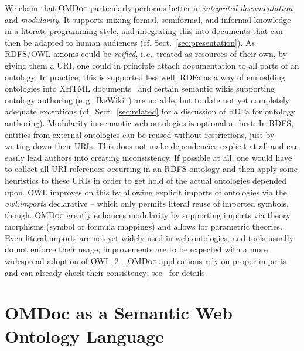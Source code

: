 \documentclass{llncs}
\renewcommand{\omdoc}{\textsc{OMDoc}\xspace}
\begin{document}
We claim that \omdoc particularly performs better in {\emph{integrated documentation}} and
{\emph{modularity}}.  It supports mixing formal, semiformal, and informal knowledge in a
literate-programming style, and integrating this into documents that can then be adapted
to human audiences (cf. Sect.~\ref{sec:presentation}).  As RDFS/OWL axioms could be
\emph{reified}, i.\,e.\ treated as resources of their own, by giving them a URI, one could
in principle attach documentation to all parts of an ontology.  In practice, this is
supported less well.  RDFa as a way of embedding ontologies into XHTML
documents~\cite{AdidaEtAl08:RDFa} and certain semantic wikis supporting ontology authoring
(e.\,g.\ IkeWiki~\cite{schaffert06:STICA-ikewiki}) are notable, but to date not yet
completely adequate exceptions (cf.\ Sect.~\ref{sec:related} for a discussion of RDFa for
ontology authoring).  Modularity in semantic web ontologies is optional at best: In RDFS,
entities from external ontologies can be reused without restrictions, just by writing down
their URIs.  This does not make dependencies explicit at all and can easily lead authors
into creating inconsistency.  If possible at all, one would have to collect all URI
references occurring in an RDFS ontology and then apply some heuristics to these URIs in
order to get hold of the actual ontologies depended upon.  OWL improves on this by
allowing explicit imports of ontologies via the \textit{owl:imports} declarative -- which
only permits literal reuse of imported symbols, though.  \omdoc greatly enhances
modularity by supporting imports via theory morphisms (symbol or formula mappings) and
allows for parametric theories. Even literal imports are not yet widely used in web
ontologies, and tools usually do not enforce their usage; improvements are to be expected
with a more widespread adoption of OWL~2~\cite{GrauEtAl:OWL2}.  \omdoc applications rely
on proper imports and can already check their consistency;
see~\cite{RabeKohlhase:ExchangeModularKnowledge} for details.

\section{OMDoc as a Semantic Web Ontology Language}\label{sec:omdoc-ontology}
\end{document}
